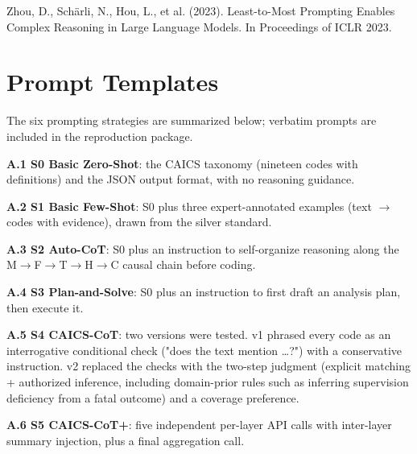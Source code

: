 \documentclass[11pt]{article}
\begin{document}
Zhou, D., Schärli, N., Hou, L., et al. (2023). Least-to-Most Prompting Enables Complex Reasoning in Large Language Models. In Proceedings of ICLR 2023.

\appendix
\section*{Prompt Templates}
The six prompting strategies are summarized below; verbatim prompts are included in the reproduction package.

\textbf{A.1 S0 Basic Zero-Shot}: the CAICS taxonomy (nineteen codes with definitions) and the JSON output format, with no reasoning guidance.

\textbf{A.2 S1 Basic Few-Shot}: S0 plus three expert-annotated examples (text $\rightarrow$ codes with evidence), drawn from the silver standard.

\textbf{A.3 S2 Auto-CoT}: S0 plus an instruction to self-organize reasoning along the M$\rightarrow$F$\rightarrow$T$\rightarrow$H$\rightarrow$C causal chain before coding.

\textbf{A.4 S3 Plan-and-Solve}: S0 plus an instruction to first draft an analysis plan, then execute it.

\textbf{A.5 S4 CAICS-CoT}: two versions were tested. v1 phrased every code as an interrogative conditional check ("does the text mention …?") with a conservative instruction. v2 replaced the checks with the two-step judgment (explicit matching + authorized inference, including domain-prior rules such as inferring supervision deficiency from a fatal outcome) and a coverage preference.

\textbf{A.6 S5 CAICS-CoT+}: five independent per-layer API calls with inter-layer summary injection, plus a final aggregation call.
\end{document}
